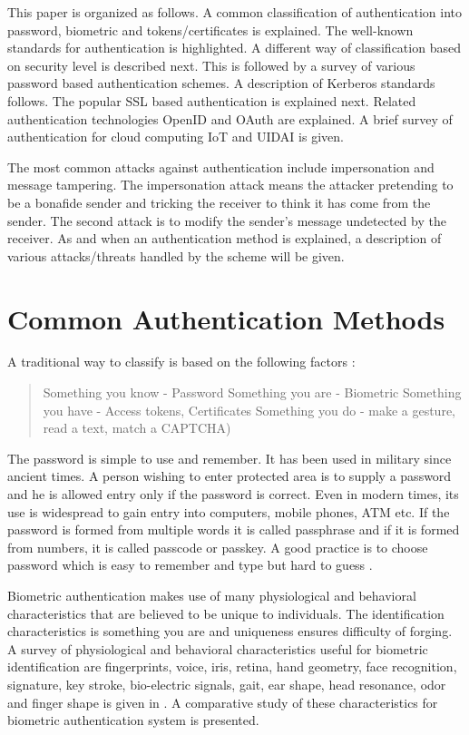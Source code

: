\begin{multicols}{2}
This paper is organized as follows. A common classification of authentication into password, biometric and tokens/certificates is explained. The well-known standards for authentication is highlighted. A different way of classification based on security level is described next. This is followed by a survey of various password based authentication schemes. A description of Kerberos standards follows. The popular SSL based authentication is explained next. Related authentication technologies OpenID and OAuth are explained. A brief survey of authentication for cloud computing IoT and UIDAI is given.

The most common attacks against authentication include impersonation and message tampering. The impersonation attack means the attacker pretending to be a bonafide sender and tricking the receiver to think it has come from the sender. The second attack is to modify the sender's message undetected by the receiver. As and when an authentication method is explained, a description of various attacks/threats handled by the scheme will be given.

\section*{Common Authentication Methods}

A traditional way to classify is based on the following factors \cite{key2}:
\begin{quote}
Something you know - Password
Something you are - Biometric
Something you have - Access tokens, Certificates
Something you do - make a gesture, read a text, match a CAPTCHA)
\end{quote}

The password is simple to use and remember. It has been used in military since ancient times. A person wishing to enter protected area is to supply a password and he is allowed entry only if the password is correct. Even in modern times, its use is widespread to gain entry into computers, mobile phones, ATM etc. If the password is formed from multiple words it is called passphrase and if it is formed from numbers, it is called passcode or passkey. A good practice is to choose password which is easy to remember and type but hard to guess \cite{key2}.

Biometric authentication makes use of many physiological and behavioral characteristics that are believed to be unique to individuals. The identification characteristics is something you are and uniqueness ensures difficulty of forging. A survey of physiological and behavioral characteristics useful for biometric identification are fingerprints, voice, iris, retina, hand geometry, face recognition, signature, key stroke, bio-electric signals, gait, ear shape, head resonance, odor and finger shape is given in \cite{key3}. A comparative study of these characteristics for biometric authentication system is presented. 


\end{multicols}
